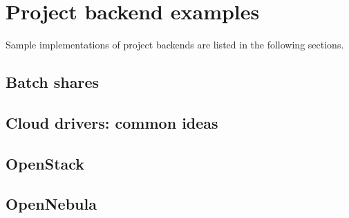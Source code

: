 \section{Project backend examples}
Sample implementations of project backends are listed in the following sections.
\subsection{Batch shares}

\subsection{Cloud drivers: common ideas}

\subsection{OpenStack}

\subsection{OpenNebula}


